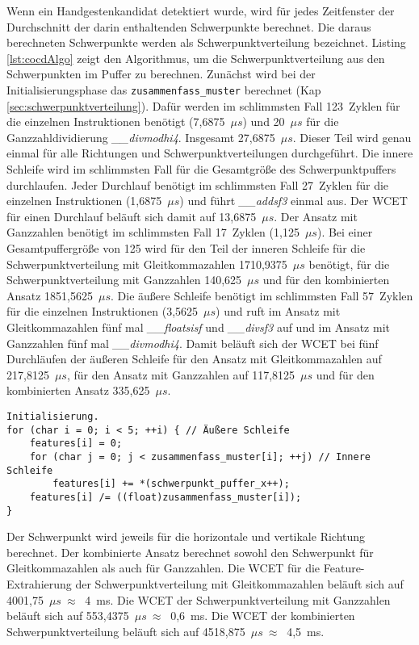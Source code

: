 Wenn ein Handgestenkandidat detektiert wurde, wird für jedes Zeitfenster der Durchschnitt der darin enthaltenden Schwerpunkte berechnet. Die daraus berechneten Schwerpunkte werden als Schwerpunktverteilung bezeichnet.
Listing \ref{lst:cocdAlgo} zeigt den Algorithmus, um die Schwerpunktverteilung aus den Schwerpunkten im Puffer zu berechnen. Zunächst wird bei der Initialisierungsphase das \texttt{zusammenfass\_muster} berechnet
(Kap \ref{sec:schwerpunktverteilung}). Dafür werden im schlimmsten Fall 123~Zyklen für die einzelnen Instruktionen benötigt (7,6875~$\mu s$) und 20~$\mu s$ für die Ganzzahldividierung \textit{\_\_divmodhi4}. Insgesamt
27,6875~$\mu s$. Dieser Teil wird genau einmal für alle Richtungen und Schwerpunktverteilungen durchgeführt. Die innere Schleife wird im schlimmsten Fall für die Gesamtgröße des Schwerpunktpuffers durchlaufen.
Jeder Durchlauf benötigt im schlimmsten Fall 27~Zyklen für die einzelnen Instruktionen (1,6875~$\mu s$) und führt \textit{\_\_addsf3} einmal aus. Der WCET für einen Durchlauf beläuft sich damit auf 13,6875~$\mu s$.
Der Ansatz mit Ganzzahlen benötigt im schlimmsten Fall 17~Zyklen (1,125~$\mu s$). Bei einer Gesamtpuffergröße von 125 wird für den Teil der inneren Schleife für die Schwerpunktverteilung mit Gleitkommazahlen
1710,9375~$\mu s$ benötigt, für die Schwerpunktverteilung mit Ganzzahlen 140,625~$\mu s$ und für den kombinierten Ansatz 1851,5625~$\mu s$. Die äußere Schleife benötigt im schlimmsten Fall 57~Zyklen für die einzelnen
Instruktionen (3,5625~$\mu s$) und ruft im Ansatz mit Gleitkommazahlen fünf mal \textit{\_\_floatsisf} und \textit{\_\_divsf3} auf und im Ansatz mit Ganzzahlen fünf mal \textit{\_\_divmodhi4}. Damit beläuft sich der WCET
bei fünf Durchläufen der äußeren Schleife für den Ansatz mit Gleitkommazahlen auf 217,8125~$\mu s$, für den Ansatz mit Ganzzahlen auf 117,8125~$\mu s$ und für den kombinierten Ansatz 335,625~$\mu s$.
\begin{lstlisting}[label=lst:cocdAlgo,caption={Algorithmus um die Schwerpunktverteilung in horizontaler Richtung zu berechnen.}]
Initialisierung.
for (char i = 0; i < 5; ++i) { // Äußere Schleife
    features[i] = 0;
    for (char j = 0; j < zusammenfass_muster[i]; ++j) // Innere Schleife
        features[i] += *(schwerpunkt_puffer_x++);
    features[i] /= ((float)zusammenfass_muster[i]);
}
\end{lstlisting}
Der Schwerpunkt wird jeweils für die horizontale und vertikale Richtung berechnet. Der kombinierte Ansatz berechnet sowohl den Schwerpunkt für Gleitkommazahlen als auch für Ganzzahlen. Die WCET für die Feature-Extrahierung
der Schwerpunktverteilung mit Gleitkommazahlen beläuft sich auf 4001,75~$\mu s\ \approx\ $ 4~ms. Die WCET der Schwerpunktverteilung mit Ganzzahlen beläuft sich auf 553,4375~$\mu s\ \approx\ $ 0,6~ms. Die WCET der kombinierten
Schwerpunktverteilung beläuft sich auf 4518,875~$\mu s\ \approx\ $ 4,5~ms.
